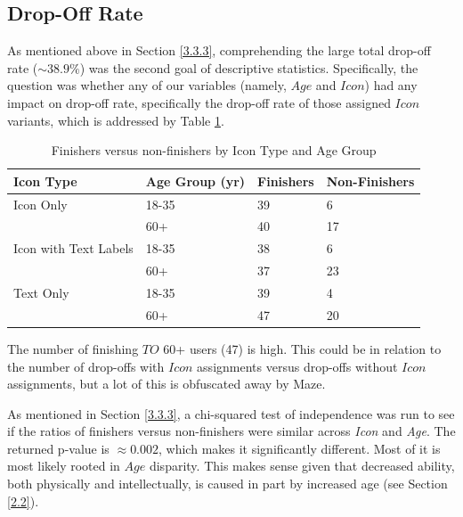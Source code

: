 \documentclass[12pt,twoside]{reedthesis}
\begin{document}
    \subsection{Drop-Off Rate}\label{4.1.3}

    As mentioned above in Section \ref{3.3.3}, comprehending the large total drop-off rate ($\sim38.9\%$) was the second goal of descriptive statistics. Specifically, the question was whether any of our variables (namely, $Age$ and $Icon$) had any impact on drop-off rate, specifically the drop-off rate of those assigned $Icon$ variants, which is addressed by Table \ref{finish}.

    \begin{table}[H]
        \centering
        \begin{tabular}{| p{4cm} | p{3cm} | p{2.5cm}| p{3cm} |}
            \hline
            Icon Type & Age Group (yr) & Finishers & Non-Finishers\\
            \hline
            Icon Only & 18-35 & 39 & 6\\
            \hline
            & 60+ & 40 & 17\\
            \hline
            Icon with Text Labels & 18-35 & 38 & 6\\
            \hline
            & 60+ & 37 & 23\\
            \hline
            Text Only & 18-35 & 39 & 4 \\
            \hline
             & 60+ & 47 & 20\\
            \hline
        \end{tabular}
        \caption{Finishers versus non-finishers by Icon Type and Age Group}
        \label{finish}
    \end{table}

    The number of finishing $TO$ 60+ users (47) is high. This could be in relation to the number of drop-offs with $Icon$ assignments versus drop-offs without $Icon$ assignments, but a lot of this is obfuscated away by Maze.
    
    As mentioned in Section \ref{3.3.3}, a chi-squared test of independence was run to see if the ratios of finishers versus non-finishers were similar across \textit{Icon} and \textit{Age}. The returned p-value is $\approx0.002$, which makes it significantly different. Most of it is most likely rooted in $Age$ disparity. This makes sense given that decreased ability, both physically and intellectually, is caused in part by increased age (see Section \ref{2.2}). 
\end{document}
